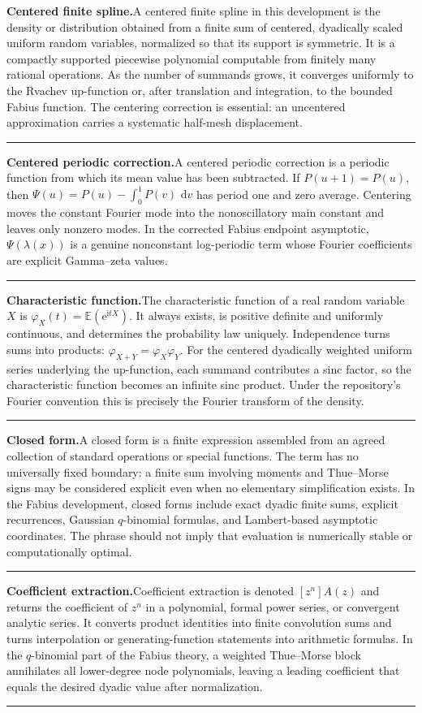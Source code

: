 \documentclass[11pt,oneside]{article}
\newcommand{\e}{\mathrm e}
\newcommand{\ii}{\mathrm i}
\newcommand{\dd}{\,\mathrm d}
\newcommand{\E}{\mathbb E}
\newcommand{\glossaryentry}[3]{%
  \par\addvspace{0.95\baselineskip}%
  \phantomsection\hypertarget{gls:#1}{}%
  \noindent\textbf{\large #2.}\enspace #3\par
  \nopagebreak[2]\vspace{0.15\baselineskip}%
  \noindent\color{rulegray}\rule{\linewidth}{0.25pt}\color{black}%
}
\begin{document}
\glossaryentry{centered-finite-spline}{Centered finite spline}{A centered finite spline in this development is the density or distribution obtained from a finite sum of centered, dyadically scaled uniform random variables, normalized so that its support is symmetric. It is a compactly supported piecewise polynomial computable from finitely many rational operations. As the number of summands grows, it converges uniformly to the Rvachev up-function or, after translation and integration, to the bounded Fabius function. The centering correction is essential: an uncentered approximation carries a systematic half-mesh displacement.}
\glossaryentry{centered-periodic-correction}{Centered periodic correction}{A centered periodic correction is a periodic function from which its mean value has been subtracted. If \(P(u+1)=P(u)\), then \(\Psi(u)=P(u)-\int_0^1P(v)\,\dd v\) has period one and zero average. Centering moves the constant Fourier mode into the nonoscillatory main constant and leaves only nonzero modes. In the corrected Fabius endpoint asymptotic, \(\Psi(\lambda(x))\) is a genuine nonconstant log-periodic term whose Fourier coefficients are explicit Gamma--zeta values.}
\glossaryentry{characteristic-function}{Characteristic function}{The characteristic function of a real random variable \(X\) is \(\varphi_X(t)=\E(\e^{\ii tX})\). It always exists, is positive definite and uniformly continuous, and determines the probability law uniquely. Independence turns sums into products: \(\varphi_{X+Y}=\varphi_X\varphi_Y\). For the centered dyadically weighted uniform series underlying the up-function, each summand contributes a sinc factor, so the characteristic function becomes an infinite sinc product. Under the repository's Fourier convention this is precisely the Fourier transform of the density.}
\glossaryentry{closed-form}{Closed form}{A closed form is a finite expression assembled from an agreed collection of standard operations or special functions. The term has no universally fixed boundary: a finite sum involving moments and Thue--Morse signs may be considered explicit even when no elementary simplification exists. In the Fabius development, closed forms include exact dyadic finite sums, explicit recurrences, Gaussian \(q\)-binomial formulas, and Lambert-based asymptotic coordinates. The phrase should not imply that evaluation is numerically stable or computationally optimal.}
\glossaryentry{coefficient-extraction}{Coefficient extraction}{Coefficient extraction is denoted \([z^n]A(z)\) and returns the coefficient of \(z^n\) in a polynomial, formal power series, or convergent analytic series. It converts product identities into finite convolution sums and turns interpolation or generating-function statements into arithmetic formulas. In the \(q\)-binomial part of the Fabius theory, a weighted Thue--Morse block annihilates all lower-degree node polynomials, leaving a leading coefficient that equals the desired dyadic value after normalization.}
\end{document}
